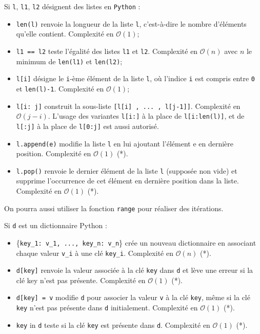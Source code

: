 Si \lstinline{l}, \lstinline{l1}, \lstinline{l2} désignent des listes en \lstinline{Python} : 
\begin{itemize}
\item  \lstinline{len(l)} renvoie la longueur de la liste \lstinline{l}, c'est-à-dire le nombre d'éléments qu'elle contient. Complexité en $\mathcal{O}(1)$;
\item  \lstinline{l1 == l2} teste l'égalité des listes \lstinline{l1} et \lstinline{l2}. Complexité en $\mathcal{O}(n)$ avec $n$ le minimum de \lstinline{len(l1)} et \lstinline{len(l2)};
\item  \lstinline{l[i]} désigne le \lstinline{i}-ème élément de la liste \lstinline{l}, où l'indice \lstinline{i} est compris entre \lstinline{0} et \lstinline{len(l)-1}. Complexité en $\mathcal{O}(1)$;
\item  \lstinline{l[i: j]} construit la sous-liste \lstinline{[l[i] , ... , l[j-1]]}. Complexité en $\mathcal{O}(j-i)$. L'usage des variantes \lstinline{l[i:]} à la place de \lstinline{l[i:len(l)]}, et de \lstinline{l[:j]} à la place de \lstinline{l[0:j]} est aussi autorisé. 
\item \lstinline{l.append(e)} modifie la liste \lstinline{l} en lui ajoutant l'élément e en dernière position. Complexité en $\mathcal{O}(1)$ (*).
\item \lstinline{l.pop()} renvoie le dernier élément de la liste \lstinline{l} (supposée non vide) et supprime l'occurrence de cet élément en dernière position dans la liste. Complexité en $\mathcal{O}(1)$ (*).
\end{itemize} 
On pourra aussi utiliser la fonction \lstinline{range} pour réaliser des itérations.

\vspace{.5cm}

Si \lstinline{d} est un dictionnaire Python :
\begin{itemize}
\item \{\lstinline{key_1: v_1, ..., key_n: v_n}\} crée un nouveau dictionnaire en associant chaque valeur
\lstinline{v_i} à une clé \lstinline{key_i}. Complexité en $\mathcal{O}(n)$ (*).
\item \lstinline{d[key]} renvoie la valeur associée à la clé \lstinline{key} dans \lstinline{d} et lève une erreur si la clé key n'est
pas présente. Complexité en $\mathcal{O}(1)$ (*).
\item \lstinline{d[key] = v} modifie \lstinline{d} pour associer la valeur \lstinline{v} à la clé \lstinline{key}, même si la clé \lstinline{key} n'est pas
présente dans \lstinline{d} initialement. Complexité en $\mathcal{O}(1)$ (*).
\item \lstinline{key} in \lstinline{d} teste si la clé \lstinline{key} est présente dans \lstinline{d}. Complexité en $\mathcal{O}(1)$ (*).
\end{itemize}

